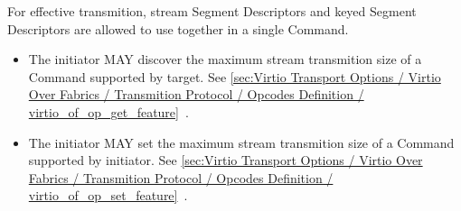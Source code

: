 For effective transmition, stream Segment Descriptors and keyed Segment Descriptors are allowed to use together in a single Command.

\begin{itemize}
\item The initiator MAY discover the maximum stream transmition size of a Command supported by target. See \ref{sec:Virtio Transport Options / Virtio Over Fabrics / Transmition Protocol / Opcodes Definition / virtio_of_op_get_feature}~.
\item The initiator MAY set the maximum stream transmition size of a Command supported by initiator. See \ref{sec:Virtio Transport Options / Virtio Over Fabrics / Transmition Protocol / Opcodes Definition / virtio_of_op_set_feature}~.
\end{itemize}

